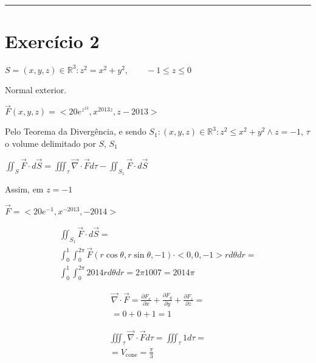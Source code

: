 \documentclass{article}
\newcommand{\R}[0]{\mathbb{R}}
\newcommand{\dS}[0]{d \vec{S}}
\newcommand{\vF}[0]{\vec{F}}
\newcommand{\partialFrac}[2]{\frac{\partial #1}{\partial #2}}
\newcommand{\divergent}[1]{\vec{\nabla} \cdot #1}
\begin{document}
\vspace{5mm}

\rule{\textwidth}{0.4pt}

\vspace{5mm}

\section{Exercício 2}

\begin{center}
$S = {(x,y,z) \in \R^3 : z^2 = x^2 + y^2, \qquad -1 \le z \le 0}$
\end{center}

Normal exterior.

\begin{center}
$\vF(x,y,z) = <20e^{z^13}, x^{2013z}, z-2013>$
\end{center}

Pelo Teorema da Divergência, e sendo $S_1 : {(x,y,z) \in \R^3: z^2\leq x^2+y^2 \land z=-1}$,
$\tau$ o volume delimitado por $S$, $S_1$

\begin{center}
$\iint_S \vF \cdot \dS = \iiint_\tau \divergent{\vF} d\tau - \iint_{S_1} \vF \cdot \dS$
\end{center}

Assim, em $z=-1$

\vspace{5mm}

\begin{center}
$\vF = <20 e^{-1}, x^{-2013}, -2014>$
\end{center}

\begin{gather*}
\iint_{S_1} \vF \cdot \dS =\\
\int_0^1 \int_0^{2 \pi} \vF(r \cos\theta, r \sin\theta, -1) \cdot <0,0,-1> r d\theta dr =\\
\int_0^1 \int_0^{2 \pi} 2014 r d\theta dr = 2\pi 1007 = 2014 \pi
\end{gather*}

\vspace{5mm}

\begin{gather*}
\divergent{\vF} = \partialFrac{F_x}{x} + \partialFrac{F_y}{y} + \partialFrac{F_z}{z} =\\
= 0+0+1 = 1
\end{gather*}

\vspace{5mm}

\begin{gather*}
\iiint_\tau \divergent{\vF} d\tau = \iiint_\tau 1 d\tau =\\
= V_{\textrm{cone}} = \frac{\pi}{3}
\end{gather*}
\end{document}
